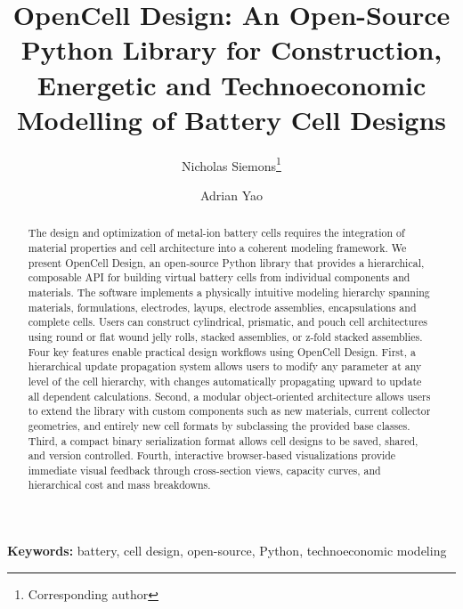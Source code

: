 \documentclass[12pt]{article}
\begin{document}
\title{OpenCell Design: An Open-Source Python Library for Construction, Energetic and Technoeconomic Modelling of Battery Cell Designs}

\author[1]{Nicholas Siemons\thanks{Corresponding author}}
\author[1]{Adrian Yao}

\maketitle

\begin{abstract}
The design and optimization of metal-ion battery cells requires the integration of material properties and cell architecture into a coherent modeling framework. We present OpenCell Design, an open-source Python library that provides a hierarchical, composable API for building virtual battery cells from individual components and materials. The software implements a physically intuitive modeling hierarchy spanning materials, formulations, electrodes, layups, electrode assemblies, encapsulations and complete cells. Users can construct cylindrical, prismatic, and pouch cell architectures using round or flat wound jelly rolls, stacked assemblies, or z-fold stacked assemblies. Four key features enable practical design workflows using OpenCell Design. First, a hierarchical update propagation system allows users to modify any parameter at any level of the cell hierarchy, with changes automatically propagating upward to update all dependent calculations. Second, a modular object-oriented architecture allows users to extend the library with custom components such as new materials, current collector geometries, and entirely new cell formats by subclassing the provided base classes. Third, a compact binary serialization format allows cell designs to be saved, shared, and version controlled. Fourth, interactive browser-based visualizations provide immediate visual feedback through cross-section views, capacity curves, and hierarchical cost and mass breakdowns.
\end{abstract}

\noindent\textbf{Keywords:} battery, cell design, open-source, Python, technoeconomic modeling

\vspace{1em}

\newpage

\end{document}

